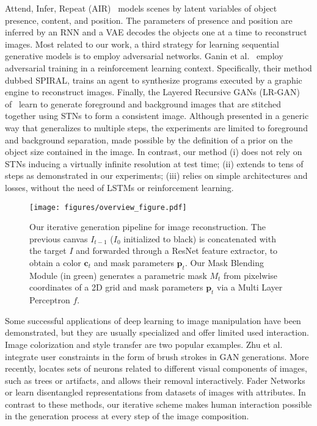\documentclass[10pt,twocolumn,letterpaper]{article}
\def\mypar#1{\vspace{1mm}{\bf #1.}\hspace{1mm}}
\begin{document}
Attend, Infer, Repeat (AIR)~\cite{Eslami2016AIR} models scenes by latent variables of object presence, content, and position. The parameters of presence and position are inferred by an RNN and a VAE decodes the objects one at a time to reconstruct images. 
Most related to our work, a third strategy for learning sequential generative models is to employ adversarial networks. Ganin et al.~\cite{ganin2018synthesizing} employ adversarial training in a reinforcement learning context. Specifically, their method dubbed SPIRAL, trains an agent to synthesize programs executed by a graphic engine to reconstruct images.    
Finally, the Layered Recursive GANs (LR-GAN) of~\cite{Yang2017LRGAN} learn to generate foreground and background images that are stitched together using STNs to form a consistent image. Although presented in a generic way that generalizes to multiple steps, the experiments are limited to foreground and background separation, made possible by the definition of a prior on the object size contained in the image. 
In contrast, our method (i) does not rely on STNs inducing a virtually infinite resolution at test time; (ii) extends to tens of steps as demonstrated in our experiments; (iii) relies on  simple architectures and losses, without the need of LSTMs or reinforcement learning.  



\begin{figure*}[t!]
\begin{center}
\texttt{[image: figures/overview\_figure.pdf]}
\end{center}
    \vspace{-3mm}
    \caption{Our iterative generation pipeline for image reconstruction. The previous canvas $I_{t-1}$ ($I_0$ initialized to black) is concatenated with the target $I$ and forwarded through a ResNet feature extractor, to obtain a color $\textbf{c}_t$ and mask parameters $\textbf{p}_t$. 
    Our Mask Blending Module (in green) generates a parametric mask $M_t$ from pixelwise coordinates of a 2D grid and mask parameters $\textbf{p}_t$ via a Multi Layer Perceptron $f$.}
\label{fig:mask_generation_and_blending}
\end{figure*}


\mypar{Image manipulation} 
Some successful applications of deep learning to image manipulation have been demonstrated, but they are usually specialized and offer limited used interaction. Image colorization \cite{zhang2016colorful} and style transfer \cite{Gatys2016ImageStyleTransfer} are two popular examples. Zhu et al. \cite{Zhu2016manipulation} integrate user constraints in the form of brush strokes in GAN generations. More recently, \cite{bau2018gandissect} locates sets of neurons related to different visual components of images, such as trees or artifacts, and allows their removal interactively.
Fader Networks \cite{lample2017fader} or \cite{Mathieu16Disentangling} learn disentangled representations from datasets of images with attributes.  In contrast to these methods, our iterative scheme makes human interaction possible in the generation process at every step of the image composition.
\end{document}
